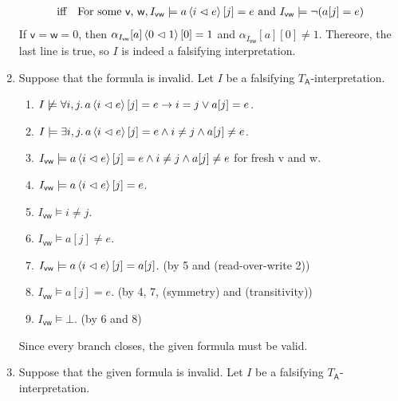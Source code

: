 \begin{exer}[3.4]
\begin{enumerate}[label=(\alph*)]
\begin{align*}
                &\text{iff}\quad \text{For some \textsf{v}, \textsf{w}}, I_{\textsf{vw}} \models a\ev{i \vartriangleleft e}[j] = e \text{ and } I_{\textsf{vw}} \models \neg(a[j] = e) \\
            \end{align*}
            If $\textsf{v} = \textsf{w} = 0$, then $\alpha_{I_{\textsf{vw}}}[a]\ev{0 \vartriangleleft 1}[0] = 1$ and $\alpha_{I_{\textsf{vw}}}[a][0] \ne 1$.
            Thereore, the last line is true, so $I$ is indeed a falsifying interpretation.
        \item
            Suppose that the formula is invalid.
            Let $I$ be a falsifying $T_{\textsf{A}}$-interpretation.
            \begin{enumerate}[label=\arabic*.]
                \item %
                    $I \not\models \forall i, j.\, a\ev{i \vartriangleleft e}[j] = e \rightarrow i = j \lor a[j] = e$.
                \item %
                    $I \models \exists i, j.\, a\ev{i \vartriangleleft e}[j] = e \land i \ne j \land a[j] \ne e$.
                \item %
                    $I_{\textsf{vw}} \models a\ev{i \vartriangleleft e}[j] = e \land i \ne j \land a[j] \ne e$ for fresh \textsf{v} and \textsf{w}.
                \item %
                    $I_{\textsf{vw}} \models a\ev{i \vartriangleleft e}[j] = e$.
                \item %
                    $I_{\textsf{vw}} \models i \ne j$.
                \item %
                    $I_{\textsf{vw}} \models a[j] \ne e$.
                \item %
                    $I_{\textsf{vw}} \models a\ev{i \vartriangleleft e}[j] = a[j]$. (by 5 and \textsf{(read-over-write 2)})
                \item %
                    $I_{\textsf{vw}} \models a[j] = e$. (by 4, 7, \textsf{(symmetry)} and \textsf{(transitivity)})
                \item %
                    $I_{\textsf{vw}} \models \bot$. (by 6 and 8)
            \end{enumerate}
            Since every branch closes, the given formula must be valid.
        \item
            Suppose that the given formula is invalid.
            Let $I$ be a falsifying $T_{\textsf{A}}$-interpretation.
            \begin{enumerate}[label=\arabic*.]

\end{enumerate}
\end{enumerate}
\end{exer}
